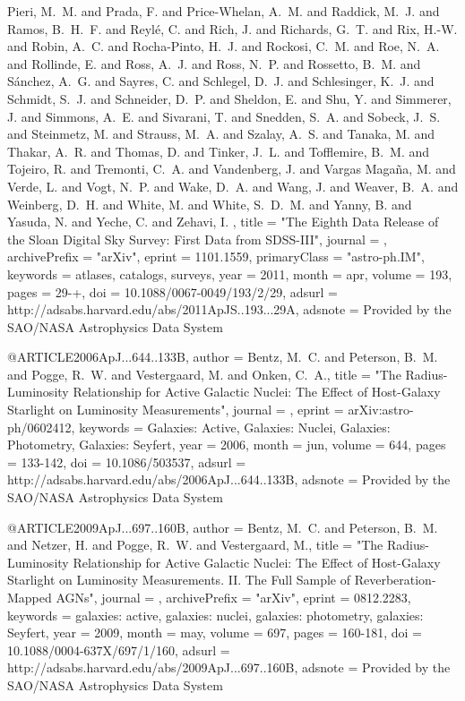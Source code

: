 \documentclass[twocolumn]{aastex62}
\begin{document}
{{	{Pieri}, M.~M. and {Prada}, F. and {Price-Whelan}, A.~M. and 
	{Raddick}, M.~J. and {Ramos}, B.~H.~F. and {Reyl{\'e}}, C. and 
	{Rich}, J. and {Richards}, G.~T. and {Rix}, H.-W. and {Robin}, A.~C. and 
	{Rocha-Pinto}, H.~J. and {Rockosi}, C.~M. and {Roe}, N.~A. and 
	{Rollinde}, E. and {Ross}, A.~J. and {Ross}, N.~P. and {Rossetto}, B.~M. and 
	{S{\'a}nchez}, A.~G. and {Sayres}, C. and {Schlegel}, D.~J. and 
	{Schlesinger}, K.~J. and {Schmidt}, S.~J. and {Schneider}, D.~P. and 
	{Sheldon}, E. and {Shu}, Y. and {Simmerer}, J. and {Simmons}, A.~E. and 
	{Sivarani}, T. and {Snedden}, S.~A. and {Sobeck}, J.~S. and 
	{Steinmetz}, M. and {Strauss}, M.~A. and {Szalay}, A.~S. and 
	{Tanaka}, M. and {Thakar}, A.~R. and {Thomas}, D. and {Tinker}, J.~L. and 
	{Tofflemire}, B.~M. and {Tojeiro}, R. and {Tremonti}, C.~A. and 
	{Vandenberg}, J. and {Vargas Maga{\~n}a}, M. and {Verde}, L. and 
	{Vogt}, N.~P. and {Wake}, D.~A. and {Wang}, J. and {Weaver}, B.~A. and 
	{Weinberg}, D.~H. and {White}, M. and {White}, S.~D.~M. and 
	{Yanny}, B. and {Yasuda}, N. and {Yeche}, C. and {Zehavi}, I.
	},
    title = "{The Eighth Data Release of the Sloan Digital Sky Survey: First Data from SDSS-III}",
  journal = {\apjs},
archivePrefix = "arXiv",
   eprint = {1101.1559},
 primaryClass = "astro-ph.IM",
 keywords = {atlases, catalogs, surveys},
     year = 2011,
    month = apr,
   volume = 193,
    pages = {29-+},
      doi = {10.1088/0067-0049/193/2/29},
   adsurl = {http://adsabs.harvard.edu/abs/2011ApJS..193...29A},
  adsnote = {Provided by the SAO/NASA Astrophysics Data System}
}





@ARTICLE{2006ApJ...644..133B,
   author = {{Bentz}, M.~C. and {Peterson}, B.~M. and {Pogge}, R.~W. and 
	{Vestergaard}, M. and {Onken}, C.~A.},
    title = "{The Radius-Luminosity Relationship for Active Galactic Nuclei: The Effect of Host-Galaxy Starlight on Luminosity Measurements}",
  journal = {\apj},
   eprint = {arXiv:astro-ph/0602412},
 keywords = {Galaxies: Active, Galaxies: Nuclei, Galaxies: Photometry, Galaxies: Seyfert},
     year = 2006,
    month = jun,
   volume = 644,
    pages = {133-142},
      doi = {10.1086/503537},
   adsurl = {http://adsabs.harvard.edu/abs/2006ApJ...644..133B},
  adsnote = {Provided by the SAO/NASA Astrophysics Data System}
}


@ARTICLE{2009ApJ...697..160B,
   author = {{Bentz}, M.~C. and {Peterson}, B.~M. and {Netzer}, H. and {Pogge}, R.~W. and 
	{Vestergaard}, M.},
    title = "{The Radius-Luminosity Relationship for Active Galactic Nuclei: The Effect of Host-Galaxy Starlight on Luminosity Measurements. II. The Full Sample of Reverberation-Mapped AGNs}",
  journal = {\apj},
archivePrefix = "arXiv",
   eprint = {0812.2283},
 keywords = {galaxies: active, galaxies: nuclei, galaxies: photometry, galaxies: Seyfert},
     year = 2009,
    month = may,
   volume = 697,
    pages = {160-181},
      doi = {10.1088/0004-637X/697/1/160},
   adsurl = {http://adsabs.harvard.edu/abs/2009ApJ...697..160B},
  adsnote = {Provided by the SAO/NASA Astrophysics Data System}
}
\end{document}
